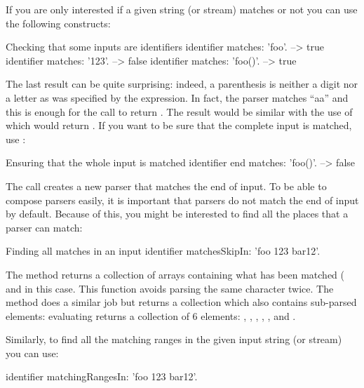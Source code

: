 \documentclass[a4paper,10pt,twoside]{book}
\begin{document}
If you are only interested if a given string (or stream) matches or
not you can use the following constructs:

\begin{script}{Checking that some inputs are identifiers}
identifier matches: 'foo'.        --> true
identifier matches: '123'.        --> false
identifier matches: 'foo()'.      --> true
\end{script}

The last result can be quite surprising:%
indeed, a parenthesis is neither a digit nor a letter as was specified
by the  expression. In fact, the 
parser matches ``aa'' and this is enough for the  call to
return . The result would be similar with the use of
 which would return . %
If you want to be sure that the complete input is matched, use
:

\begin{script}{Ensuring that the whole input is matched}
identifier end matches: 'foo()'.   --> false
\end{script}

The  call creates a new parser that matches the end of input.
To be able to compose parsers easily, it is important that parsers do
not match the end of input by default. Because of this, you might be
interested to find all the places that a parser can match:

\begin{script}{Finding all matches in an input}
identifier matchesSkipIn: 'foo 123 bar12'.  
\end{script}

The  method returns a collection
of arrays containing what has been matched (\eg{} 
and  in this case. This function avoids
parsing the same character twice. The method
 does a similar job but returns a
collection which also contains sub-parsed elements: \eg{} evaluating
 returns a collection of 6
elements: , , ,
, ,%
and .

Similarly, to find all the matching ranges in the given input string
(or stream) you can use:

\begin{code}{}
identifier matchingRangesIn: 'foo 123 bar12'.  
\end{code}
\end{document}
